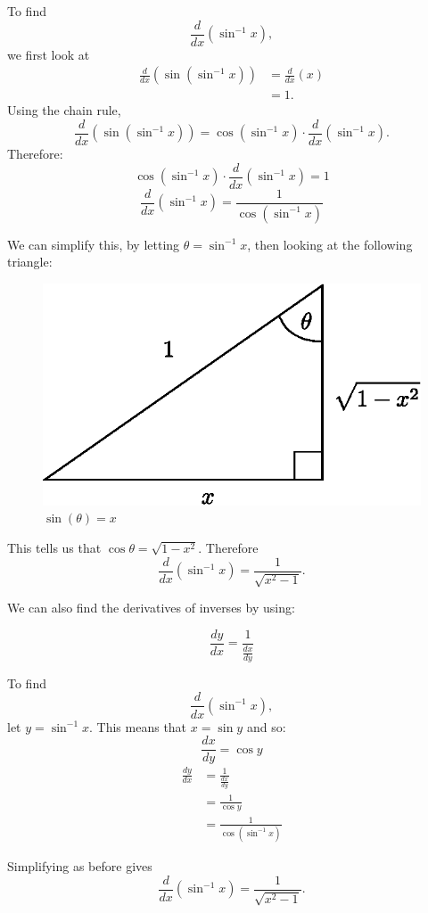 \begin{example}
To find 
$$\frac{d}{dx}\left(\sin^{-1}x\right),$$
we first look at
\begin{align*}
\frac{d}{dx}\left(\sin\left(\sin^{-1}x\right)\right)&=\frac{d}{dx}\left(x\right)\\
&=1.
\end{align*}
Using the chain rule,
$$\frac{d}{dx}\left(\sin\left(\sin^{-1}x\right)\right)=\cos\left(\sin^{-1}x\right)\cdot\frac{d}{dx}\left(\sin^{-1}x\right).$$
Therefore:
$$\cos\left(\sin^{-1}x\right)\cdot\frac{d}{dx}\left(\sin^{-1}x\right)=1$$
$$\frac{d}{dx}\left(\sin^{-1}x\right)=\frac{1}{\cos\left(\sin^{-1}x\right)}$$

We can simplify this, by letting $\theta=\sin^{-1}x$, then looking at the following triangle:
\begin{figure}[H]
\centering
\includegraphics[scale=0.8]{img/right-angle-tri-arcsin}
\captionstyle{\centering\it}
\caption{$\sin(\theta)=x$}
\label{fig:right-angle-tri-arcsin}
\end{figure}

This tells us that $\cos\theta = \sqrt{1-x^2}$. Therefore
$$\frac{d}{dx}\left(\sin^{-1}x\right)=\frac{1}{\sqrt{x^2-1}}.$$

\end{example}

We can also find the derivatives of inverses by using:
\begin{in_a_box}
$$\frac{dy}{dx}=\frac{1}{\frac{dx}{dy}}$$
\end{in_a_box}

\begin{example}
To find 
$$\frac{d}{dx}\left(\sin^{-1}x\right),$$
let $y=\sin^{-1}x$. This means that $x=\sin y$ and so:
$$\frac{dx}{dy}=\cos y$$
\begin{align*}
\frac{dy}{dx}&=\frac{1}{\frac{dx}{dy}}\\
&=\frac{1}{\cos y}\\
&=\frac{1}{\cos\left(\sin^{-1}x\right)}
\end{align*}

Simplifying as before gives
$$\frac{d}{dx}\left(\sin^{-1}x\right)=\frac{1}{\sqrt{x^2-1}}.$$

\end{example}


